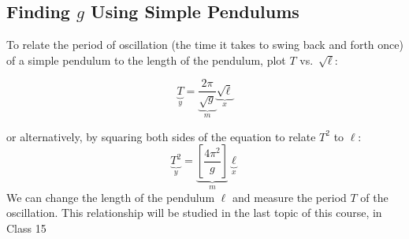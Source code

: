 \subsection{Finding $g$ Using Simple Pendulums}

To relate the period of oscillation (the time it takes to swing back and
forth once) of a simple pendulum to the length of the pendulum, plot $T$
vs.\ $\sqrt\ell$:

\begin{equation*}
  \underbrace{T}_y=\underbrace{\frac{2\pi}{\sqrt g}}_m
  \underbrace{\sqrt\ell}_x
\end{equation*}

or alternatively, by squaring both sides of the equation to relate $T^2$ to
$\ell$:
\begin{equation*}
  \underbrace{T^2}_y=\underbrace{\left[\frac{4\pi^2}g\right]}_m
  \underbrace{\ell}_x
\end{equation*}
We can change the length of the pendulum $\ell$ and measure the period $T$ of
the oscillation. This relationship will be studied in the last topic of this
course, in Class 15
